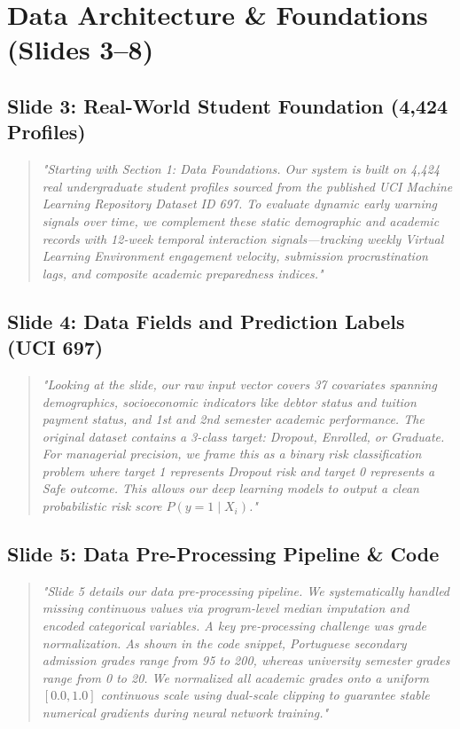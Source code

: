 \documentclass[11pt, a4paper]{article}
\begin{document}
\section{Data Architecture \& Foundations (Slides 3--8)}

\subsection{Slide 3: Real-World Student Foundation (4,424 Profiles)}
\begin{quote}\small \itshape
"Starting with Section 1: Data Foundations. Our system is built on 4,424 real undergraduate student profiles sourced from the published UCI Machine Learning Repository Dataset ID 697. To evaluate dynamic early warning signals over time, we complement these static demographic and academic records with 12-week temporal interaction signals---tracking weekly Virtual Learning Environment engagement velocity, submission procrastination lags, and composite academic preparedness indices."
\end{quote}

\subsection{Slide 4: Data Fields and Prediction Labels (UCI 697)}
\begin{quote}\small \itshape
"Looking at the slide, our raw input vector covers 37 covariates spanning demographics, socioeconomic indicators like debtor status and tuition payment status, and 1st and 2nd semester academic performance. The original dataset contains a 3-class target: Dropout, Enrolled, or Graduate. For managerial precision, we frame this as a binary risk classification problem where target 1 represents Dropout risk and target 0 represents a Safe outcome. This allows our deep learning models to output a clean probabilistic risk score $P(y=1 \mid X_i)$."
\end{quote}

\subsection{Slide 5: Data Pre-Processing Pipeline \& Code}
\begin{quote}\small \itshape
"Slide 5 details our data pre-processing pipeline. We systematically handled missing continuous values via program-level median imputation and encoded categorical variables. A key pre-processing challenge was grade normalization. As shown in the code snippet, Portuguese secondary admission grades range from 95 to 200, whereas university semester grades range from 0 to 20. We normalized all academic grades onto a uniform $[0.0, 1.0]$ continuous scale using dual-scale clipping to guarantee stable numerical gradients during neural network training."
\end{quote}
\end{document}
